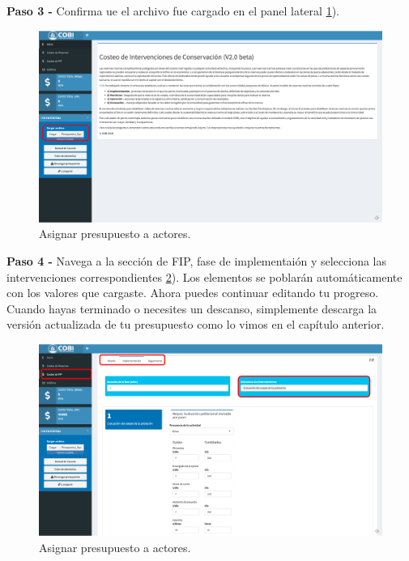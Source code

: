 \documentclass[
]{book}
\begin{document}
\textbf{Paso 3 - } Confirma ue el archivo fue cargado en el panel lateral \ref{fig:up-3}).

\begin{figure}
\centering
\includegraphics{images/up-3.png}
\caption{\label{fig:up-3}Asignar presupuesto a actores.}
\end{figure}

\textbf{Paso 4 - } Navega a la sección de FIP, fase de implementaión y selecciona las intervenciones correspondientes \ref{fig:up-4}). Los elementos se poblarán automáticamente con los valores que cargaste. Ahora puedes continuar editando tu progreso. Cuando hayas terminado o necesites un descanso, simplemente descarga la versión actualizada de tu presupuesto como lo vimos en el capítulo anterior.

\begin{figure}
\centering
\includegraphics{images/up-4.png}
\caption{\label{fig:up-4}Asignar presupuesto a actores.}
\end{figure}

  
\end{document}
